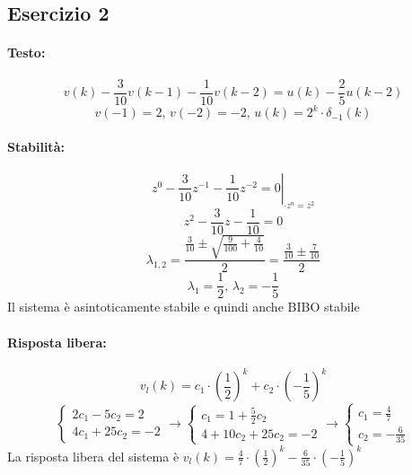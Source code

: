\documentclass[a4paper,oneside,titlepage]{book}
\begin{document}
\subsection{Esercizio 2}
\paragraph{Testo:}
\[ v(k) - \frac{3}{10} v(k-1) - \frac{1}{10} v(k-2) = u(k) - \frac{2}{5} u(k-2) \]
\[ v(-1) = 2, \, v(-2) = -2, \, u(k) = 2^k \cdot \delta_{-1}(k) \]

\paragraph{Stabilità:}
\[ \left. z^0 - \frac{3}{10} z^{-1} - \frac{1}{10} z^{-2} = 0 \right|_{\cdot z^n = z^2} \]
\[ z^2 - \frac{3}{10} z - \frac{1}{10} = 0 \]
\[ \lambda_{1,2} = \frac{\frac{3}{10} \pm \sqrt{\frac{9}{100} + \frac{4}{10}}}{2} = \frac{\frac{3}{10} \pm \frac{7}{10}}{2}\]
\[ \lambda_1 = \frac{1}{2}, \, \lambda_2 = - \frac{1}{5} \]
Il sistema è asintoticamente stabile e quindi anche BIBO stabile

\paragraph{Risposta libera:}
\[ v_l(k) = c_1 \cdot \left( \frac{1}{2} \right)^k + c_2 \cdot \left( - \frac{1}{5} \right)^k \]
\[
\begin{cases}
2c_1 - 5c_2 = 2 \\
4c_1 + 25c_2 = -2
\end{cases}
\longrightarrow
\begin{cases}
c_1 = 1 + \frac{5}{2} c_2 \\
4 + 10c_2 + 25c_2 = -2
\end{cases}
\longrightarrow
\begin{cases}
c_1 = \frac{4}{7} \\
c_2 = - \frac{6}{35}
\end{cases}
\]
La risposta libera del sistema è $v_l(k) = \frac{4}{7} \cdot \left( \frac{1}{2} \right)^k - \frac{6}{35} \cdot \left( - \frac{1}{5} \right)^k$
\end{document}
